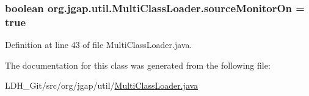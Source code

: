\hypertarget{classorg_1_1jgap_1_1util_1_1_multi_class_loader_a6b48426e9450345d5411286790932b94}{
\subsubsection[{source\-Monitor\-On}]{\setlength{\rightskip}{0pt plus 5cm}boolean org.\-jgap.\-util.\-Multi\-Class\-Loader.\-source\-Monitor\-On = true\hspace{0.3cm}{\ttfamily [protected]}}}\label{classorg_1_1jgap_1_1util_1_1_multi_class_loader_a6b48426e9450345d5411286790932b94}


Definition at line 43 of file Multi\-Class\-Loader.\-java.



The documentation for this class was generated from the following file\-:\begin{DoxyCompactItemize}
\item 
L\-D\-H\-\_\-\-Git/src/org/jgap/util/\hyperlink{_multi_class_loader_8java}{Multi\-Class\-Loader.\-java}\end{DoxyCompactItemize}
